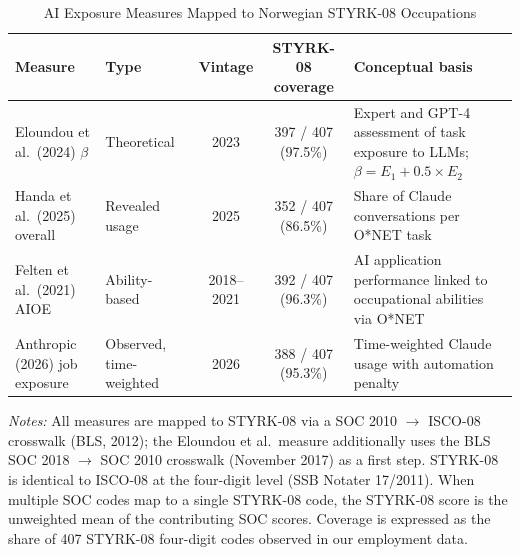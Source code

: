 \begin{table}[htbp]
\centering
\caption{AI Exposure Measures Mapped to Norwegian STYRK-08 Occupations}
\label{tab:measures}
\footnotesize
\begin{tabular}{p{3cm}p{2.2cm}ccp{4.5cm}}
\toprule
Measure & Type & Vintage & STYRK-08 coverage & Conceptual basis \\
\midrule
Eloundou et al.\ (2024) $\beta$ & Theoretical & 2023 & 397 / 407 (97.5\%) & Expert and GPT-4 assessment of task exposure to LLMs; $\beta = E_1 + 0.5 \times E_2$ \\[4pt]
Handa et al.\ (2025) overall & Revealed usage & 2025 & 352 / 407 (86.5\%) & Share of Claude conversations per O*NET task \\[4pt]
Felten et al.\ (2021) AIOE & Ability-based & 2018--2021 & 392 / 407 (96.3\%) & AI application performance linked to occupational abilities via O*NET \\[4pt]
Anthropic (2026) job exposure & Observed, time-weighted & 2026 & 388 / 407 (95.3\%) & Time-weighted Claude usage with automation penalty \\
\bottomrule
\end{tabular}
\par\smallskip\footnotesize
\raggedright\textit{Notes:} All measures are mapped to STYRK-08 via a SOC 2010 $\to$ ISCO-08 crosswalk (BLS, 2012); the Eloundou et al.\ measure additionally uses the BLS SOC 2018 $\to$ SOC 2010 crosswalk (November 2017) as a first step. STYRK-08 is identical to ISCO-08 at the four-digit level (SSB Notater 17/2011). When multiple SOC codes map to a single STYRK-08 code, the STYRK-08 score is the unweighted mean of the contributing SOC scores. Coverage is expressed as the share of 407 STYRK-08 four-digit codes observed in our employment data.
\end{table}
